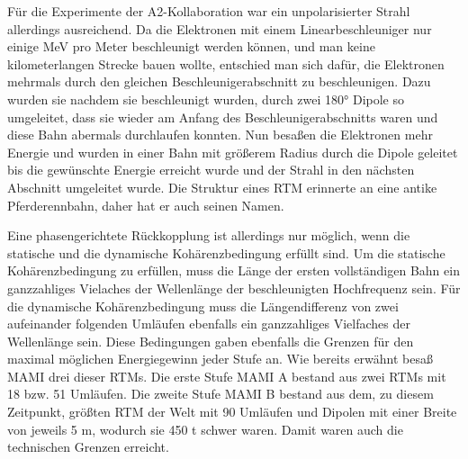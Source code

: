 \documentclass[a4paper,11pt,oneside,final,german,openbib,pdftex]{scrbook}
\begin{document}
{F\"ur die Experimente der A2-Kollaboration war ein unpolarisierter Strahl allerdings ausreichend.
\newline
Da die Elektronen mit einem Linearbeschleuniger nur einige MeV pro Meter beschleunigt werden k\"onnen, und man keine kilometerlangen Strecke bauen wollte, entschied man sich daf\"ur, die Elektronen mehrmals durch den gleichen Beschleunigerabschnitt zu beschleunigen. Dazu wurden sie nachdem sie beschleunigt wurden, durch zwei 180° Dipole so umgeleitet, dass sie wieder am Anfang des Beschleunigerabschnitts waren und diese Bahn abermals durchlaufen konnten. Nun besa{\ss}en die Elektronen mehr Energie und wurden in einer Bahn mit gr\"o{\ss}erem Radius durch die Dipole geleitet bis die gew\"unschte Energie erreicht wurde und der Strahl in den n\"achsten Abschnitt umgeleitet wurde. Die Struktur eines RTM erinnerte an eine antike Pferderennbahn, daher hat er auch seinen Namen.

 Eine phasengerichtete R\"uckkopplung ist allerdings nur m\"oglich, wenn die statische und die dynamische Koh\"arenzbedingung erf\"ullt sind. Um die statische Koh\"arenzbedingung zu erf\"ullen, muss die L\"ange der ersten vollst\"andigen Bahn ein ganzzahliges Vielaches der Wellenl\"ange der beschleunigten Hochfrequenz sein. F\"ur die dynamische Koh\"arenzbedingung muss die L\"angendifferenz von zwei aufeinander folgenden Uml\"aufen ebenfalls ein ganzzahliges Vielfaches der Wellenl\"ange sein\cite{Un08}. Diese Bedingungen gaben ebenfalls die Grenzen f\"ur den maximal m\"oglichen Energiegewinn jeder Stufe an. 
\newline
Wie bereits erw\"ahnt besa{\ss} MAMI drei dieser RTMs. Die erste Stufe MAMI A bestand aus zwei RTMs mit 18 bzw. 51 Uml\"aufen. Die zweite Stufe MAMI B bestand aus dem, zu diesem Zeitpunkt, gr\"o{\ss}ten RTM der Welt mit 90 Uml\"aufen und Dipolen mit einer Breite von jeweils 5 m, wodurch sie 450 t schwer waren. Damit waren auch die technischen Grenzen erreicht.\cite{KPh11F}


}
\end{document}
